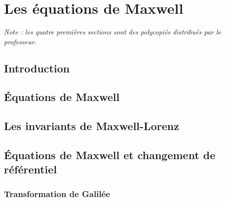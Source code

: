 \chapter{Les équations de Maxwell}


{\small \it Note : les quatre premières sections sont des polycopiés distribués par le professeur.}
\section{Introduction}
\section{Équations de Maxwell}
\section{Les invariants de Maxwell-Lorenz}
\section{Équations de Maxwell et changement de référentiel}
\subsection{Transformation de Galilée}

